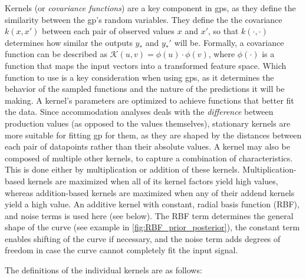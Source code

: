 Kernels (or \textit{covariance functions}) are a key component in \acp{gp}, as they define the similarity between the \acs{gp}'s random variables.
They define the the covariance $k(x, x')$ between each pair of observed values $x$ and $x'$, so that $k(\cdot, \cdot)$ determines how similar the outputs $y_*$ and $y_*'$ will be.
Formally, a covariance function can be described as $\mathcal{K}(u, v) = \phi(u) \cdot \phi(v)$, where $\phi(\cdot)$ is a function that maps the input vectors into a transformed feature space.
Which function to use is a key consideration when using \acp{gp}, as it determines the behavior of the sampled functions and the nature of the predictions it will be making.
A kernel's parameters are optimized to achieve functions that better fit the data.
Since accommodation analyses deals with the \textit{difference} between production values (as opposed to the values themselves), stationary kernels are more suitable for fitting \ac{gp} for them, as they are shaped by the distances between each pair of datapoints rather than their absolute values.
A kernel may also be composed of multiple other kernels, to capture a combination of characteristics.
This is done either by multiplication or addition of these kernels.
Multiplication-based kernels are maximized when all of its kernel factors yield high values, whereas
addition-based kernels are maximized when any of their addend kernels yield a high value.
An additive kernel with constant, radial basis function (RBF), and noise terms is used here (see  below).
The RBF term determines the general shape of the curve (see example in \cref{fig:RBF_prior_posterior}), the constant term enables shifting of the curve if necessary, and the noise term adds degrees of freedom in case the curve cannot completely fit the input signal.

The definitions of the individual kernels are as follows:

